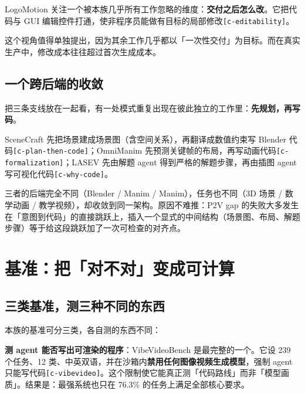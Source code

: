 LogoMotion 关注一个被本族几乎所有工作忽略的维度：\textbf{交付之后怎么改}。它把代码与 GUI 编辑控件打通，使非程序员能做有目标的局部修改{\scriptsize\texttt{[c-\hspace{0pt}editability]}}。


这个视角值得单独提出，因为其余工作几乎都以「一次性交付」为目标。而在真实生产中，修改成本往往超过首次生成成本。


\subsection{一个跨后端的收敛}

把三条支线放在一起看，有一处模式重复出现在彼此独立的工作里：\textbf{先规划，再写码}。


SceneCraft 先把场景建成场景图（含空间关系），再翻译成数值约束写 Blender 代码{\scriptsize\texttt{[c-\hspace{0pt}plan-\hspace{0pt}then-\hspace{0pt}code]}}；OmniManim 先预测关键帧的布局，再写动画代码{\scriptsize\texttt{[c-\hspace{0pt}formalization]}}；LASEV 先由解题 agent 得到严格的解题步骤，再由插图 agent 写可视化代码{\scriptsize\texttt{[c-\hspace{0pt}why-\hspace{0pt}code]}}。


三者的后端完全不同（Blender / Manim / Manim），任务也不同（3D 场景 / 数学动画 / 教学视频），却收敛到同一架构。原因不难推：P2V gap 的失败大多发生在「意图到代码」的直接跳跃上，插入一个显式的中间结构（场景图、布局、解题步骤）等于给这段跳跃加了一次可检查的对齐点。



\section{基准：把「对不对」变成可计算}

\subsection{三类基准，测三种不同的东西}

本族的基准可分三类，各自测的东西不同：


\textbf{测 agent 能否写出可渲染的程序}：VibeVideoBench 是最完整的一个。它设 239 个任务、12 类、中英双语，并在沙箱内\textbf{禁用任何图像视频生成模型}，强制 agent 只能写代码{\scriptsize\texttt{[c-\hspace{0pt}vibevideo]}}。这个限制使它能真正测「代码路线」而非「模型画质」。结果是：最强系统也只在 76.3\% 的任务上满足全部核心要求。


